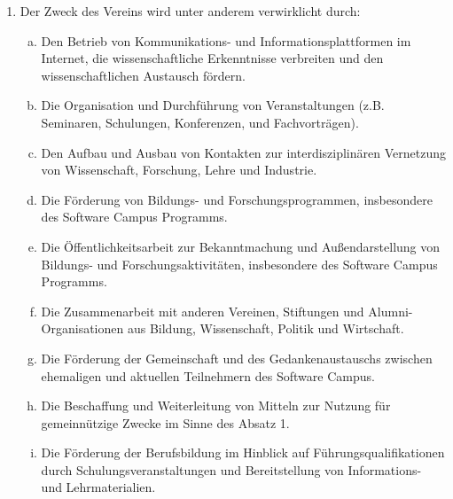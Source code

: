 \documentclass{article}
\begin{document}
\begin{enumerate}[§ 1.]
\begin{enumerate}[1.]
	\item Der Zweck des Vereins wird unter anderem verwirklicht durch:
		\begin{enumerate}[a.]
		\item Den Betrieb von Kommunikations- und Informationsplattformen im Internet,
			die wissenschaftliche Erkenntnisse verbreiten und den wissenschaftlichen Austausch fördern.
		\item Die Organisation und Durchführung von Veranstaltungen
			(z.B. Seminaren, Schulungen, Konferenzen, und Fachvorträgen).
		\item Den Aufbau und Ausbau von Kontakten zur interdisziplinären Vernetzung von Wissenschaft, Forschung, Lehre und Industrie.
		\item Die Förderung von Bildungs- und Forschungsprogrammen, insbesondere des Software Campus Programms.
		\item Die Öffentlichkeitsarbeit zur Bekanntmachung und Außendarstellung von
			Bildungs- und Forschungsaktivitäten, insbesondere des Software Campus Programms.
		\item Die Zusammenarbeit mit anderen Vereinen, Stiftungen und Alumni-Organisationen
			aus Bildung, Wissenschaft, Politik und Wirtschaft.
		\item Die Förderung der Gemeinschaft und des Gedankenaustauschs zwischen ehemaligen und aktuellen Teilnehmern des Software Campus.
		\item Die Beschaffung und Weiterleitung von Mitteln zur Nutzung für gemeinnützige Zwecke im Sinne des Absatz 1.
		\item Die Förderung der Berufsbildung im Hinblick auf Führungsqualifikationen durch Schulungsveranstaltungen
			und Bereitstellung von Informations- und Lehrmaterialien.
		\end{enumerate}
	\end{enumerate}


\end{enumerate}
\end{document}
